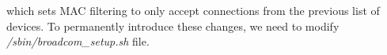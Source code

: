\documentclass[conference]{IEEEtran}
\begin{document}
which sets MAC filtering to only accept connections from the previous list of devices. To permanently introduce these changes, we need to modify
\emph{/sbin/broadcom\_setup.sh} file.
%
%



%
%
\end{document}
